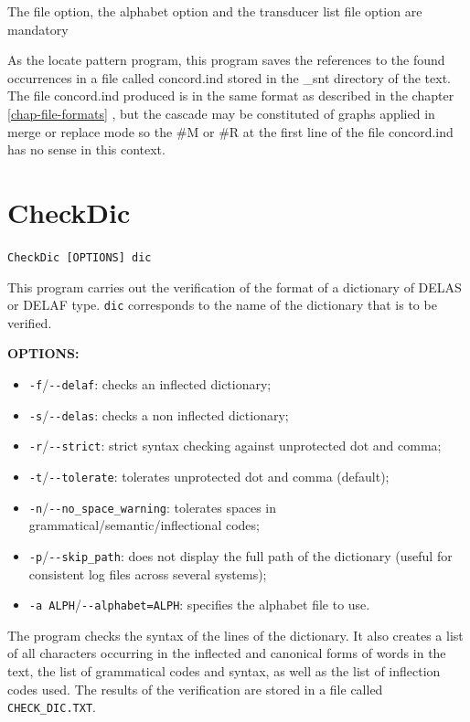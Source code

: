 \bigskip
\noindent The file option, the alphabet option and the transducer list file option are mandatory
     
\bigskip
\noindent As the locate pattern program, this program saves the references to the found occurrences in a file called concord.ind stored 
		in the \_snt directory of the text.
		The file concord.ind produced is in the same format as described in the chapter \ref{chap-file-formats} , but the cascade may be constituted of graphs 
applied in merge or replace mode so the \#M or \#R at the first line of the file concord.ind has no sense in this context.



\section{CheckDic}
\verb+CheckDic [OPTIONS] dic+

\bigskip
\noindent This program carries out the verification of the format of a dictionary
of DELAS or DELAF type. \verb+dic+ corresponds to the name
of the dictionary that is to be verified. 

\bigskip
\noindent \textbf{OPTIONS:}
\begin{itemize}
  \item \verb+-f+/\verb+--delaf+: checks an inflected dictionary;
  \item \verb+-s+/\verb+--delas+: checks a non inflected dictionary;
  \item \verb+-r+/\verb+--strict+: strict syntax checking against unprotected dot and comma;
  \item \verb+-t+/\verb+--tolerate+: tolerates unprotected dot and comma (default);
  \item \verb+-n+/\verb+--no_space_warning+: tolerates spaces in
  grammatical/semantic/inflectional codes;
  \item \verb+-p+/\verb+--skip_path+: does not display the full path of the dictionary (useful 
  for consistent log files across several systems);
  \item \verb+-a ALPH+/\verb+--alphabet=ALPH+: specifies the alphabet file to
        use. 
        
\end{itemize}

\bigskip
\noindent The program checks the syntax of the lines of the dictionary. It also creates a
list of all characters occurring in the inflected and canonical forms of words in
the text, the list of grammatical codes and syntax, as well as the list of
inflection codes used. The results of the verification are stored in a file
called \verb+CHECK_DIC.TXT+.

